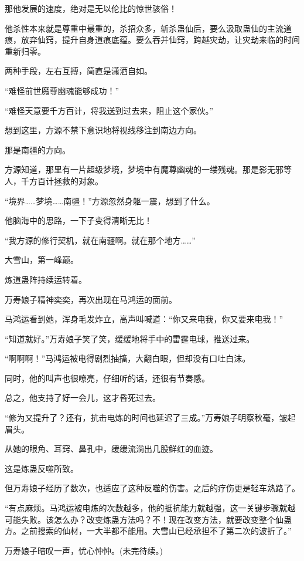 \begin{this_body}
那他发展的速度，绝对是无以伦比的惊世骇俗！

他杀性本来就是尊重中最重的，杀招众多，斩杀蛊仙后，要么汲取蛊仙的主流道痕，放弃仙窍，提升自身道痕底蕴。要么吞并仙窍，跨越灾劫，让灾劫来临的时间重新归零。

两种手段，左右互搏，简直是潇洒自如。

“难怪前世魔尊幽魂能够成功！”

“难怪天意要千方百计，将我送到过去来，阻止这个家伙。”

想到这里，方源不禁下意识地将视线移注到南边方向。

那是南疆的方向。

方源知道，那里有一片超级梦境，梦境中有魔尊幽魂的一缕残魂。那是影无邪等人，千方百计拯救的对象。

“境界……梦境……南疆！”方源忽然身躯一震，想到了什么。

他脑海中的思路，一下子变得清晰无比！

“我方源的修行契机，就在南疆啊。就在那个地方……”

大雪山，第一峰巅。

炼道蛊阵持续运转着。

万寿娘子精神奕奕，再次出现在马鸿运的面前。

马鸿运看到她，浑身毛发炸立，高声叫喊道：“你又来电我，你又要来电我！”

“知道就好。”万寿娘子笑了笑，缓缓地将手中的雷霆电球，推送过来。

“啊啊啊！”马鸿运被电得剧烈抽搐，大翻白眼，但却没有口吐白沫。

同时，他的叫声也很嘹亮，仔细听的话，还很有节奏感。

总之，他支持了好一会儿，这才昏死过去。

“修为又提升了？还有，抗击电炼的时间也延迟了三成。”万寿娘子明察秋毫，皱起眉头。

从她的眼角、耳窍、鼻孔中，缓缓流淌出几股鲜红的血迹。

这是炼蛊反噬所致。

但万寿娘子经历了数次，也适应了这种反噬的伤害。之后的疗伤更是轻车熟路了。

“有点麻烦。马鸿运被电炼的次数越多，他的抵抗能力就越强，这一关键步骤就越可能失败。该怎么办？改变炼蛊方法吗？不！现在改变方法，就要改变整个仙蛊方。之前搜索的仙材，一大半都不能用。大雪山已经承担不了第二次的波折了。”

万寿娘子暗叹一声，忧心忡忡。(未完待续。)

\end{this_body}

